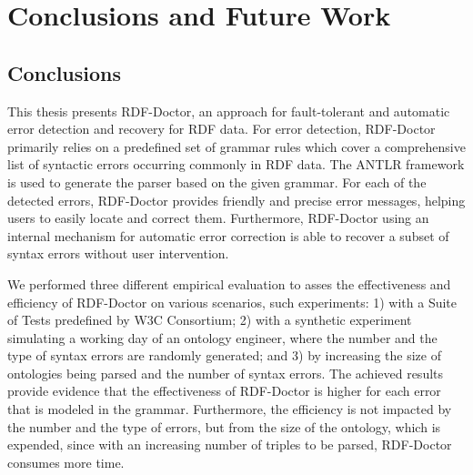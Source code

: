\chapter{Conclusions and Future Work}
\label{ch:conclusions}

\section{Conclusions}

This thesis presents RDF-Doctor, an approach for fault-tolerant and automatic error detection and recovery for RDF data.
For error detection, RDF-Doctor primarily relies on a predefined set of grammar rules which cover a comprehensive list of syntactic errors occurring commonly in RDF data.
The ANTLR framework is used to generate the parser based on the given grammar.
For each of the detected errors, RDF-Doctor provides friendly and precise error messages, helping users to easily locate and correct them.
Furthermore, RDF-Doctor using an internal mechanism for automatic error correction is able to recover a subset of syntax errors without user intervention.

We performed three different empirical evaluation to asses the effectiveness and efficiency of RDF-Doctor on various scenarios, such experiments: 1) with a Suite of Tests predefined by W3C Consortium; 2) with a synthetic experiment simulating a working day of an ontology engineer, where the number and the type of syntax errors are randomly generated; and 3) by increasing the size of ontologies being parsed and the number of syntax errors.
The achieved results provide evidence that the effectiveness of RDF-Doctor is higher for each error that is modeled in the grammar. 
Furthermore, the efficiency is not impacted by the number and the type of errors, but from the size of the ontology, which is expended, since with an increasing number of triples to be parsed, RDF-Doctor consumes more time. 




